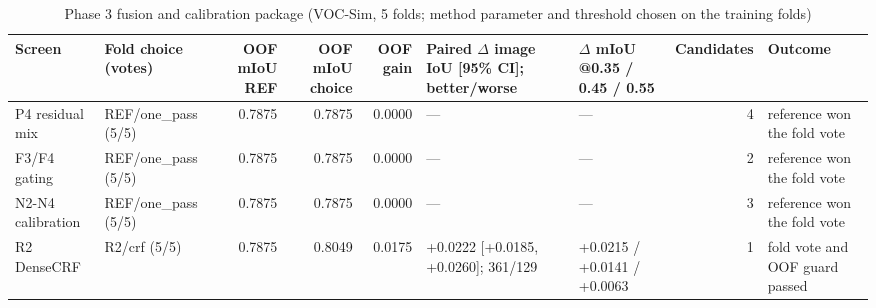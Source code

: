 \begin{table}[H]\centering\scriptsize\setlength{\tabcolsep}{3pt}
\begin{tabular}{>{\raggedright\arraybackslash}p{1.40cm}>{\raggedright\arraybackslash}p{1.40cm}rrr>{\raggedright\arraybackslash}p{1.60cm}>{\raggedright\arraybackslash}p{1.40cm}r>{\raggedright\arraybackslash}p{1.40cm}}
\toprule
Screen & Fold choice (votes) & OOF mIoU REF & OOF mIoU choice & OOF gain & Paired $\Delta$ image IoU [95\% CI]; better/\allowbreak{}worse & $\Delta$ mIoU @0.35 /\allowbreak{} 0.45 /\allowbreak{} 0.55 & Candidates & Outcome \\
\midrule
P4 residual mix & REF/\allowbreak{}one\_\allowbreak{}pass (5/\allowbreak{}5) & 0.7875 & 0.7875 & 0.0000 & --- & --- & 4 & reference won the fold vote \\
F3/\allowbreak{}F4 gating & REF/\allowbreak{}one\_\allowbreak{}pass (5/\allowbreak{}5) & 0.7875 & 0.7875 & 0.0000 & --- & --- & 2 & reference won the fold vote \\
N2-N4 calibration & REF/\allowbreak{}one\_\allowbreak{}pass (5/\allowbreak{}5) & 0.7875 & 0.7875 & 0.0000 & --- & --- & 3 & reference won the fold vote \\
R2 DenseCRF & R2/\allowbreak{}crf (5/\allowbreak{}5) & 0.7875 & 0.8049 & 0.0175 & +0.0222 [+0.0185, +0.0260]; 361/\allowbreak{}129 & +0.0215 /\allowbreak{} +0.0141 /\allowbreak{} +0.0063 & 1 & fold vote and OOF guard passed \\
\bottomrule
\end{tabular}
\caption{Phase 3 fusion and calibration package (VOC-Sim, 5 folds; method parameter and threshold chosen on the training folds)}\label{tab:a9_cv_summary}
\end{table}

